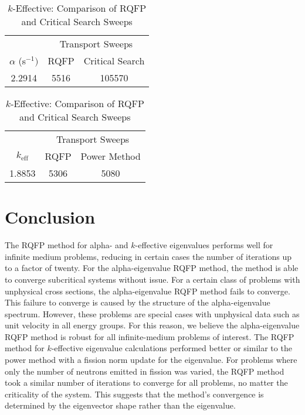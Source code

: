 \begin{table}[!htbp]
	\caption{Transport Sweep Comparisons for Problem 5.2.2.3}
	\begin{subtable}[h]{1.0\textwidth}
	\centering{}
	\begin{tabular}{@{}ccc@{}}\toprule
	& \multicolumn{2}{c}{Transport Sweeps} \\
	\cmidrule{2-3} $\alpha$  (s$^{-1}) $& RQFP & Critical Search \\
	\midrule
	2.2914 & 5516 & 105570 \\
	\bottomrule
	\end{tabular}
	\caption{Alpha-Eigenvalue: Comparison of RQFP and Critical Search Sweeps}
	\label{table:AlphaProb5223}
	\end{subtable}%
	\vspace{0.25cm}
	\begin{subtable}[h]{1.0\textwidth}
	\centering{}
	\begin{tabular}{@{}ccc@{}}\toprule
	& \multicolumn{2}{c}{Transport Sweeps} \\
	\cmidrule{2-3} $k_{\text{eff}}$ & RQFP & Power Method \\
	\midrule
	1.8853 & 5306 & 5080 \\
	\bottomrule
	\end{tabular}
	\caption{$k$-Effective: Comparison of RQFP and Critical Search Sweeps}
	\label{table:kProb5223}
	\end{subtable}%
\end{table}


\label{sec:Res}

\section{Conclusion}

The RQFP method for alpha- and $k$-effective eigenvalues performs well for infinite medium problems, reducing in certain cases the number of iterations up to a factor of twenty. For the alpha-eigenvalue RQFP method, the method is able to converge subcritical systems without issue. For a certain class of problems with unphysical cross sections, the alpha-eigenvalue RQFP method fails to converge. This failure to converge is caused by the structure of the alpha-eigenvalue spectrum. However, these problems are special cases with unphysical data such as unit velocity in all energy groups. For this reason, we believe the alpha-eigenvalue RQFP method is robust for all infinite-medium problems of interest. The RQFP method for $k$-effective eigenvalue calculations performed better or similar to the power method with a fission norm update for the eigenvalue. For problems where only the number of neutrons emitted in fission was varied, the RQFP method took a similar number of iterations to converge for all problems, no matter the criticality of the system. This suggests that the method's convergence is determined by the eigenvector shape rather than the eigenvalue.

